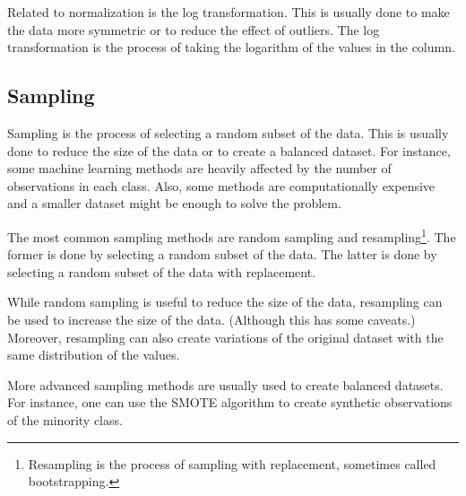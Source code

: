 Related to normalization is the log transformation.  This is usually done to make the data
more symmetric or to reduce the effect of outliers.  The log transformation is the process
of taking the logarithm of the values in the column.


\subsection{Sampling}

Sampling is the process of selecting a random subset of the data.  This is usually done to
reduce the size of the data or to create a balanced dataset.  For instance, some machine
learning methods are heavily affected by the number of observations in each class.
Also, some methods are computationally expensive and a smaller dataset might be enough to
solve the problem.

The most common sampling methods are random sampling and resampling\footnote{Resampling is
the process of sampling with replacement, sometimes called bootstrapping.}.  The former is
done by selecting a random subset of the data.  The latter is done by selecting a random
subset of the data with replacement.

While random sampling is useful to reduce the size of the data, resampling can be used to
increase the size of the data.  (Although this has some caveats.)  Moreover, resampling
can also create variations of the original dataset with the same distribution of the
values.

More advanced sampling methods are usually used to create balanced datasets.  For
instance, one can use the SMOTE algorithm to create
synthetic observations of the minority class.


